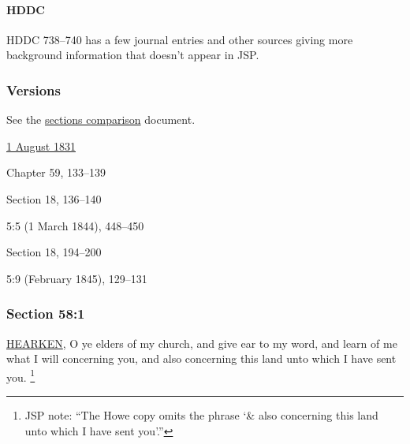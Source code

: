 		\paragraph{HDDC}
		
			HDDC 738--740 has a few journal entries and other sources giving more background information that doesn't appear in JSP.
		
	\subsubsection{Versions}
		\label{DC58-V}
		
		See the \href{https://drive.google.com/file/d/1goAvNz8jS4R8slYfMG_db55Ty2z_vmgK/view?usp=sharing}{sections comparison} document.
	
		\begin{compactdesc}
			\item[JSP] \hyperref[EMS-1831-JS-1-AUG-1831]{1 August 1831}
			\item[BC] Chapter 59, 133--139
			\item[DC 1835] Section 18, 136--140
			\item[TS] 5:5 (1 March 1844), 448--450
			\item[DC 1844] Section 18, 194--200
			\item[MS] 5:9 (February 1845), 129--131
		\end{compactdesc}

	\subsubsection{Section 58:1} %
		\label{DC58-1}

		\hyperref[HEARKEN]{HEARKEN}, O ye elders of my church, and give ear to my word, and learn of me what I will concerning you, and also concerning this land unto which I have sent you.%
			\footnote{%
				JSP note: ``The Howe copy omits the phrase `\& also concerning this land unto which I have sent you'.''
				}


